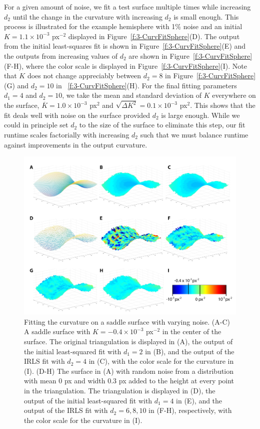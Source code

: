 For a given amount of noise, we fit a test surface multiple times while increasing $d_2$ until the change in the curvature with increasing $d_2$ is small enough.
This process is illustrated for the example hemisphere with 1\% noise and an initial $K =1.1 \times 10^{-3}$ px$^{-2}$ displayed in Figure~\ref{f:3-CurvFitSphere}(D).
The output from the initial least-squares fit is shown in Figure~\ref{f:3-CurvFitSphere}(E) and the outputs from increasing values of $d_2$ are shown in Figure~\ref{f:3-CurvFitSphere}(F-H), where the color scale is displayed in Figure~\ref{f:3-CurvFitSphere}(I).
Note that $K$ does not change appreciably between $d_2 = 8$ in Figure~\ref{f:3-CurvFitSphere}(G) and $d_2 = 10$ in ~\ref{f:3-CurvFitSphere}(H).
For the final fitting parameters $d_1 = 4$ and $d_2 = 10$, we take the mean and standard deviation of $K$ everywhere on the surface, $\overbar{K} = 1.0 \times 10^{-3}$ px$^{2}$ and $\sqrt{\Delta K^2} = 0.1 \times 10^{-3}$ px$^{2}$.
This shows that the fit deals well with noise on the surface provided $d_2$ is large enough.
While we could in principle set $d_2$ to the size of the surface to eliminate this step, our fit runtime scales factorially with increasing $d_2$ such that we must balance runtime against improvements in the output curvature.
\begin{figure}
  \centering
  \includegraphics{figures/C3/Ch3-Figs_CurvFitSaddle.png}
  \caption{Fitting the curvature on a saddle surface with varying noise.
  (A-C) A saddle surface with $K = -0.4 \times 10^{-3}$ px$^{-2}$ in the center of the surface.
  The original triangulation is displayed in (A), the output of the initial least-squared fit with $d_1=2$ in (B), and the output of the IRLS fit with $d_2=4$ in (C), with the color scale for the curvature in (I).
  (D-H) The surface in (A) with random noise from a distribution with mean 0 px and width 0.3 px added to the height at every point in the triangulation.
  The triangulation is displayed in (D), the output of the initial least-squared fit with $d_1=4$ in (E), and the output of the IRLS fit with $d_2=6,8,10$ in (F-H), respectively, with the color scale for the curvature in (I).}\label{f:3-CurvFitSaddle}
\end{figure}

